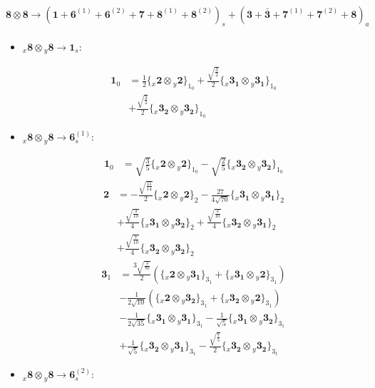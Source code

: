 \documentclass[english]{article}
\newcommand{\cgEqFontsize}{\large}
\newcommand{\rep}[1]{\mathbf{#1}}
\newcommand{\repx}[2]{{}_{#2}\mathbf{#1}}
\newcommand{\tsprod}[2]{\rep{#1}\otimes\rep{#2}}
\newcommand{\tsprodx}[2]{\repx{#1}{x}\otimes\repx{#2}{y}}
\newcommand{\subcgs}[3]{\big\{ \tsprodx{#1}{#2}\big\}^{}_{#3}}
\begin{document}
\paragraph*{\cgEqFontsize $\tsprod{8}{8}\to\left(\rep{1}+\rep{6}^{(1)}+\rep{6}^{(2)}+\rep{7}+\rep{8}^{(1)}+\rep{8}^{(2)}\right)_s+\left(\rep{3}+\rep{\bar{3}}+\rep{7}^{(1)}+\rep{7}^{(2)}+\rep{8}\right)_a$}
\begin{itemize}
\item $\tsprodx{8}{8}\to\rep{1}_{s}$:
\begin{fleqn}
\begin{align*}
\rep{1}_{0} & = \frac{1}{2}\subcgs{2}{2}{1_{0}}+\frac{\sqrt{\frac{3}{2}}}{2}\subcgs{3_{1}}{3_{1}}{1_{0}} \\ 
 & +\frac{\sqrt{\frac{3}{2}}}{2}\subcgs{3_{2}}{3_{2}}{1_{0}}
\end{align*}
\end{fleqn}
\item $\tsprodx{8}{8}\to\rep{6}_{s}^{(1)}$:
\begin{fleqn}
\begin{align*}
\rep{1}_{0} & = \sqrt{\frac{3}{5}}\subcgs{2}{2}{1_{0}}-\sqrt{\frac{2}{5}}\subcgs{3_{2}}{3_{2}}{1_{0}}
\end{align*}
\begin{align*}
\rep{2} & = -\frac{\sqrt{\frac{15}{14}}}{2}\subcgs{2}{2}{2}-\frac{27}{4 \sqrt{70}}\subcgs{3_{1}}{3_{1}}{2} \\ 
 & +\frac{\sqrt{\frac{3}{10}}}{4}\subcgs{3_{1}}{3_{2}}{2}+\frac{\sqrt{\frac{3}{10}}}{4}\subcgs{3_{2}}{3_{1}}{2} \\ 
 & +\frac{\sqrt{\frac{7}{10}}}{4}\subcgs{3_{2}}{3_{2}}{2}
\end{align*}
\begin{align*}
\rep{3}_{1} & = \frac{3 \sqrt{\frac{3}{70}}}{2}\left(\subcgs{2}{3_{1}}{3_{1}}+\subcgs{3_{1}}{2}{3_{1}}\right) \\ 
 & -\frac{1}{2 \sqrt{10}}\left(\subcgs{2}{3_{2}}{3_{1}}+\subcgs{3_{2}}{2}{3_{1}}\right) \\ 
 & -\frac{1}{2 \sqrt{35}}\subcgs{3_{1}}{3_{1}}{3_{1}}-\frac{1}{\sqrt{5}}\subcgs{3_{1}}{3_{2}}{3_{1}} \\ 
 & +\frac{1}{\sqrt{5}}\subcgs{3_{2}}{3_{1}}{3_{1}}-\frac{\sqrt{\frac{7}{5}}}{2}\subcgs{3_{2}}{3_{2}}{3_{1}}
\end{align*}
\end{fleqn}
\item $\tsprodx{8}{8}\to\rep{6}_{s}^{(2)}$:
\begin{fleqn}
\begin{align*}

\end{align*}
\end{fleqn}
\end{itemize}
\end{document}
